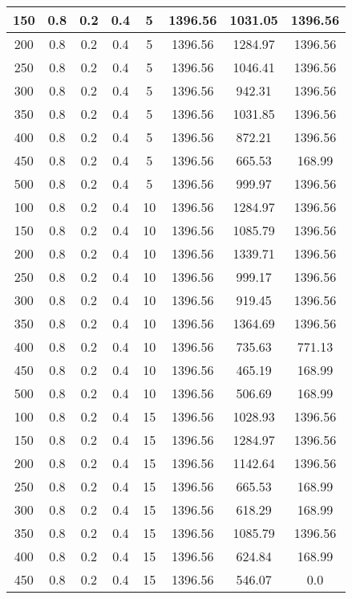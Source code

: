 \documentclass[a4paper, 12pt]{extreport}
\begin{document}
\begin{itemize}
\begin{longtable}{|c|c|c|c|c|c|c|c|}
			150 & 0.8 & 0.2 & 0.4 & 5 & 1396.56 & 1031.05 & 1396.56 \\\hline
			200 & 0.8 & 0.2 & 0.4 & 5 & 1396.56 & 1284.97 & 1396.56 \\\hline
			250 & 0.8 & 0.2 & 0.4 & 5 & 1396.56 & 1046.41 & 1396.56 \\\hline
			300 & 0.8 & 0.2 & 0.4 & 5 & 1396.56 & 942.31 & 1396.56 \\\hline
			350 & 0.8 & 0.2 & 0.4 & 5 & 1396.56 & 1031.85 & 1396.56 \\\hline
			400 & 0.8 & 0.2 & 0.4 & 5 & 1396.56 & 872.21 & 1396.56 \\\hline
			450 & 0.8 & 0.2 & 0.4 & 5 & 1396.56 & 665.53 & 168.99 \\\hline
			500 & 0.8 & 0.2 & 0.4 & 5 & 1396.56 & 999.97 & 1396.56 \\\hline
			100 & 0.8 & 0.2 & 0.4 & 10 & 1396.56 & 1284.97 & 1396.56 \\\hline
			150 & 0.8 & 0.2 & 0.4 & 10 & 1396.56 & 1085.79 & 1396.56 \\\hline
			200 & 0.8 & 0.2 & 0.4 & 10 & 1396.56 & 1339.71 & 1396.56 \\\hline
			250 & 0.8 & 0.2 & 0.4 & 10 & 1396.56 & 999.17 & 1396.56 \\\hline
			300 & 0.8 & 0.2 & 0.4 & 10 & 1396.56 & 919.45 & 1396.56 \\\hline
			350 & 0.8 & 0.2 & 0.4 & 10 & 1396.56 & 1364.69 & 1396.56 \\\hline
			400 & 0.8 & 0.2 & 0.4 & 10 & 1396.56 & 735.63 & 771.13 \\\hline
			450 & 0.8 & 0.2 & 0.4 & 10 & 1396.56 & 465.19 & 168.99 \\\hline
			500 & 0.8 & 0.2 & 0.4 & 10 & 1396.56 & 506.69 & 168.99 \\\hline
			100 & 0.8 & 0.2 & 0.4 & 15 & 1396.56 & 1028.93 & 1396.56 \\\hline
			150 & 0.8 & 0.2 & 0.4 & 15 & 1396.56 & 1284.97 & 1396.56 \\\hline
			200 & 0.8 & 0.2 & 0.4 & 15 & 1396.56 & 1142.64 & 1396.56 \\\hline
			250 & 0.8 & 0.2 & 0.4 & 15 & 1396.56 & 665.53 & 168.99 \\\hline
			300 & 0.8 & 0.2 & 0.4 & 15 & 1396.56 & 618.29 & 168.99 \\\hline
			350 & 0.8 & 0.2 & 0.4 & 15 & 1396.56 & 1085.79 & 1396.56 \\\hline
			400 & 0.8 & 0.2 & 0.4 & 15 & 1396.56 & 624.84 & 168.99 \\\hline
			450 & 0.8 & 0.2 & 0.4 & 15 & 1396.56 & 546.07 & 0.0 \\\hline

\end{longtable}
\end{itemize}
\end{document}
